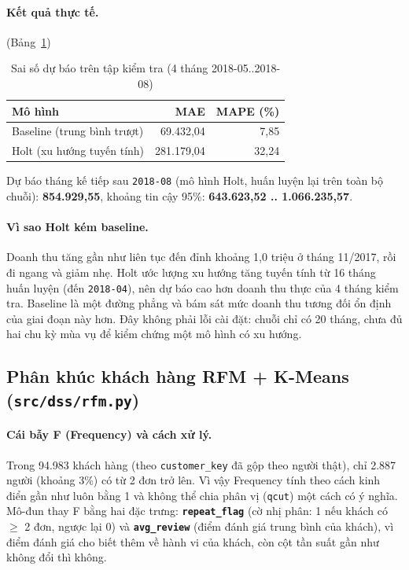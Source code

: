 \documentclass[12pt,a4paper]{article}
\newcommand{\code}[1]{\texttt{\small #1}}
\begin{document}
\paragraph{Kết quả thực tế.} (Bảng~\ref{tab:forecast-result})

\begin{table}[h]
\centering
\caption{Sai số dự báo trên tập kiểm tra (4 tháng 2018-05..2018-08)}\label{tab:forecast-result}
\small
\begin{tabular}{@{}l r r@{}}
\toprule
\textbf{Mô hình} & \textbf{MAE} & \textbf{MAPE (\%)}\\
\midrule
Baseline (trung bình trượt) & 69.432,04 & 7,85\\
Holt (xu hướng tuyến tính) & 281.179,04 & 32,24\\
\bottomrule
\end{tabular}
\end{table}

Dự báo tháng kế tiếp sau \code{2018-08} (mô hình Holt, huấn luyện lại trên toàn bộ chuỗi): \textbf{854.929,55},
khoảng tin cậy 95\%: \textbf{643.623,52 .. 1.066.235,57}.

\paragraph{Vì sao Holt kém baseline.} Doanh thu tăng gần như liên tục đến đỉnh khoảng 1,0 triệu ở tháng
11/2017, rồi đi ngang và giảm nhẹ. Holt ước lượng xu hướng tăng tuyến tính từ 16 tháng huấn luyện (đến
\code{2018-04}), nên dự báo cao hơn doanh thu thực của 4 tháng kiểm tra. Baseline là một đường phẳng và bám sát
mức doanh thu tương đối ổn định của giai đoạn này hơn. Đây không phải lỗi cài đặt: chuỗi chỉ có 20 tháng, chưa
đủ hai chu kỳ mùa vụ để kiểm chứng một mô hình có xu hướng.

\subsection{Phân khúc khách hàng RFM + K-Means (\code{src/dss/rfm.py})}

\paragraph{Cái bẫy F (Frequency) và cách xử lý.} Trong 94.983 khách hàng (theo \code{customer\_key} đã gộp
theo người thật), chỉ 2.887 người (khoảng 3\%) có từ 2 đơn trở lên. Vì vậy Frequency tính theo cách kinh điển
gần như luôn bằng 1 và không thể chia phân vị (\code{qcut}) một cách có ý nghĩa. Mô-đun thay F bằng hai đặc trưng:
\textbf{\code{repeat\_flag}} (cờ nhị phân: 1 nếu khách có \(\ge\) 2 đơn, ngược lại 0) và
\textbf{\code{avg\_review}} (điểm đánh giá trung bình của khách), vì điểm đánh giá cho biết thêm về hành vi của khách,
còn cột tần suất gần như không đổi thì không.
\end{document}
